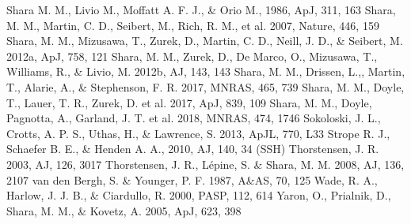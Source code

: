 \documentclass[a4paper,fleqn,usenatbib]{mnras}
\begin{document}
\begin{thebibliography}{99}
 Shara M. M., Livio M., Moffatt A. F. J., \& Orio M., 1986, ApJ, 311, 163
 Shara, M. M., Martin, C. D., Seibert, M., Rich, R. M., et al.  2007, Nature, 446, 159
 Shara, M. M., Mizusawa, T., Zurek, D., Martin, C. D., Neill, J. D., \& Seibert, M. 2012a, ApJ, 758, 121
 Shara, M. M., Zurek, D., De Marco, O., Mizusawa, T., Williams, R., \& Livio, M. 2012b, AJ, 143, 143
 Shara, M. M., Drissen, L.,, Martin, T., Alarie, A., \& Stephenson, F. R.  2017, MNRAS, 465, 739
 Shara, M. M., Doyle, T., Lauer, T. R., Zurek, D. et al.  2017, ApJ, 839, 109
 Shara, M. M., Doyle, Pagnotta, A., Garland, J. T. et al.  2018, MNRAS, 474, 1746
 Sokoloski, J. L., Crotts, A. P. S., Uthas, H., \& Lawrence, S. 2013, ApJL, 770, L33
 Strope R. J., Schaefer B. E., \& Henden A. A., 2010, AJ, 140, 34 (SSH)
 Thorstensen, J. R. 2003, AJ, 126, 3017
 Thorstensen, J. R., L\'{e}pine, S. \& Shara, M. M.  2008, AJ, 136, 2107
 van den Bergh, S. \& Younger, P. F. 1987, A\&AS, 70, 125
 Wade, R. A., Harlow, J. J. B., \& Ciardullo, R. 2000, PASP, 112, 614
 Yaron, O., Prialnik, D., Shara, M. M., \& Kovetz, A.  2005, ApJ, 623, 398


\end{thebibliography}{}
\end{document}
